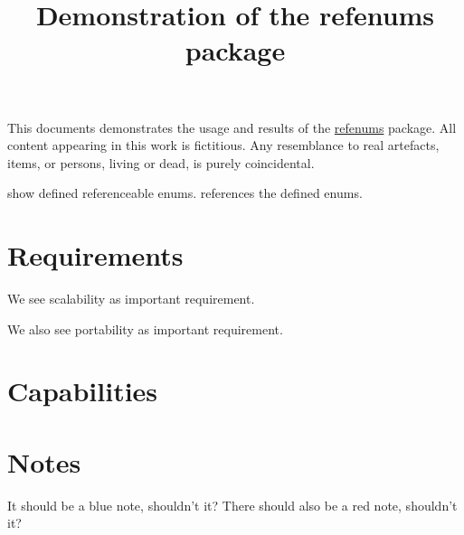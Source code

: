 \documentclass[parskip=full]{scrartcl}
\begin{document}
\title{Demonstration of the refenums package}
\date{}
\author{}
\maketitle

\vspace{-12ex}
This documents demonstrates the usage and results of the \href{http://www.ctan.org/pkg/refenums}{refenums} package.
All content appearing in this work is fictitious.
Any resemblance to real artefacts, items, or persons, living or dead, is purely coincidental.

 show defined referenceable enums.
 references the defined enums.

\tableofcontents
\clearpage








\section{Requirements}
\label{sec:reqs}
We see scalability as important requirement.

We also see portability as important requirement.


\section{Capabilities}

\section{Notes}
 It should be a blue note, shouldn't it?
 There should also be a red note, shouldn't it?
\end{document}

